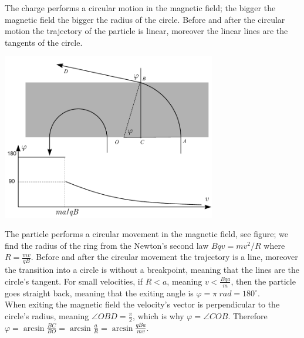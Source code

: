 {\ifEngHint
The charge performs a circular motion in the magnetic field; the bigger the magnetic field the bigger the radius of the circle. Before and after the circular motion the trajectory of the particle is linear, moreover the linear lines are the tangents of the circle.
\fi


\ifEngSolution
\begin{center}
\includegraphics[width=0.7\textwidth]{2015-v2g-09-magnetvalilah}
\end{center}
The particle performs a circular movement in the magnetic field, see figure; we find the radius of the ring from the Newton’s second law $Bqv=mv^2/R$ where $R=\frac{mv}{qB}$. Before and after the circular movement the trajectory is a line, moreover the transition into a circle is without a breakpoint, meaning that the lines are the circle’s tangent. For small velocities, if $R<a$, meaning $v<\frac{Bqa}{m}$, then the particle goes straight back, meaning that the exiting angle is $\varphi=\pi \SI{}{rad}=180^\circ$.\\
When exiting the magnetic field the velocity’s vector is perpendicular to the circle’s radius, meaning $\angle OBD=\frac \pi 2$, which is why $\varphi=\angle COB$. Therefore $\varphi=\arcsin \frac{BC}{BO}=\arcsin \frac{a}{R}=\arcsin \frac{qBa}{mv}$.
\fi
}